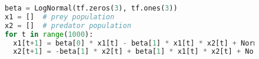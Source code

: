 \documentclass{article} %
\title{}
\author{}
\begin{document}
\maketitle

\begin{figure}[t]
\begin{lstlisting}[language=python]
beta = LogNormal(tf.zeros(3), tf.ones(3))
x1 = []  # prey population
x2 = []  # predator population
for t in range(1000):
  x1[t+1] = beta[0] * x1[t] - beta[1] * x1[t] * x2[t] + Normal(0.0, 10.0)
  x2[t+1] = -beta[1] * x2[t] + beta[1] * x1[t] * x2[t] + Normal(0.0, 10.0)
\end{lstlisting}
\caption{}
\end{figure}

% 
% 
\end{document}
